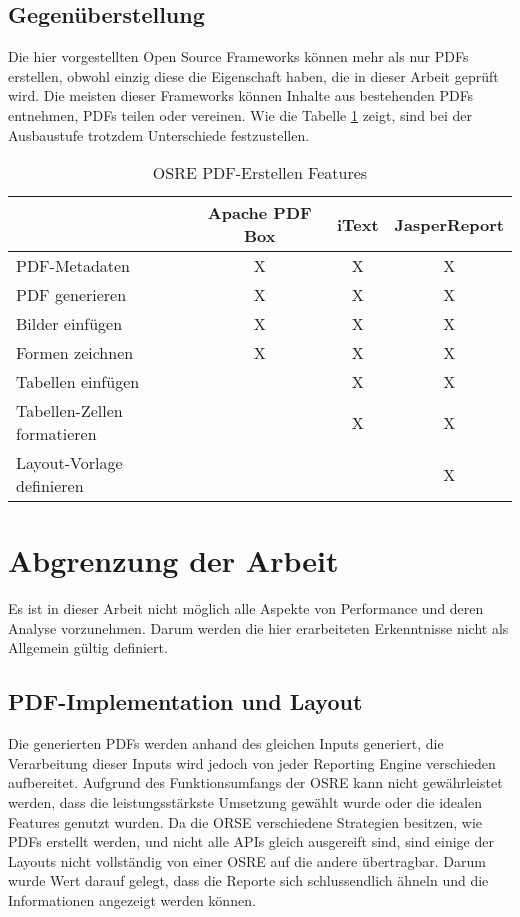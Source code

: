 \documentclass[main.tex]{subfiles}
\begin{document}
\subsection{Gegenüberstellung}

Die hier vorgestellten Open Source Frameworks können mehr als nur PDFs erstellen, obwohl einzig diese die Eigenschaft haben, die in dieser Arbeit geprüft wird. Die meisten dieser Frameworks können Inhalte aus bestehenden PDFs entnehmen, PDFs teilen oder vereinen. 
Wie die Tabelle \ref{table:featuresOSRE} zeigt, sind bei der Ausbaustufe trotzdem Unterschiede festzustellen. 


\begin{table}[h]
\centering

\begin{tabular}{lccc}
               & Apache PDF Box & iText  & JasperReport \\ \hline
PDF-Metadaten           &         X      &   X    &     X        \\
PDF generieren   &         X      &   X    &     X        \\
Bilder einfügen         &  X             &   X    &     X        \\
Formen zeichnen         &  X             &   X    &     X        \\
Tabellen einfügen                &                &   X    &     X        \\
Tabellen-Zellen formatieren      &                &   X    &     X        \\
Layout-Vorlage definieren         &                &        &     X        \\
\end{tabular}
\caption{OSRE PDF-Erstellen Features}
\label{table:featuresOSRE}
\end{table}


\section{ Abgrenzung der Arbeit}

Es ist in dieser Arbeit nicht möglich alle Aspekte von Performance und deren Analyse vorzunehmen. Darum werden die hier erarbeiteten Erkenntnisse nicht als Allgemein gültig definiert. 

\subsection{PDF-Implementation und Layout} 
Die generierten PDFs werden anhand des gleichen Inputs generiert, die Verarbeitung dieser Inputs wird jedoch von jeder Reporting Engine verschieden aufbereitet. Aufgrund des Funktionsumfangs der OSRE kann nicht gewährleistet werden, dass die leistungsstärkste Umsetzung gewählt wurde oder die idealen Features genutzt wurden. Da die ORSE verschiedene Strategien besitzen, wie PDFs erstellt werden, und nicht alle APIs gleich ausgereift sind, sind einige der Layouts nicht vollständig von einer OSRE auf die andere übertragbar. Darum wurde Wert darauf gelegt, dass die Reporte sich schlussendlich ähneln und die Informationen angezeigt werden können.
\end{document}
